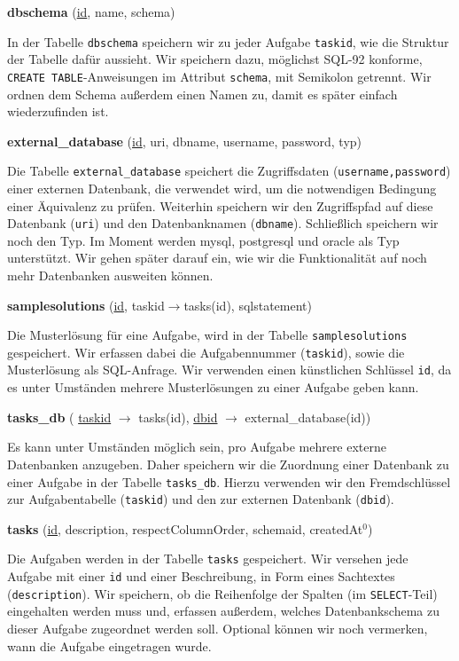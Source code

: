 \textbf{dbschema} (\underline{id}, name, schema)

In der Tabelle \verb|dbschema| speichern wir zu jeder Aufgabe \verb|taskid|, wie die Struktur der Tabelle dafür aussieht. Wir speichern dazu, möglichst SQL-92 konforme, \verb|CREATE TABLE|-Anweisungen im Attribut \verb|schema|, mit Semikolon getrennt. Wir ordnen dem Schema außerdem einen Namen zu, damit es später einfach wiederzufinden ist.

\textbf{external\_database} (\underline{id}, uri, dbname, username, password, typ)

Die Tabelle \verb|external_database| speichert die Zugriffsdaten (\verb|username,password|) einer externen Datenbank, die verwendet wird, um die notwendigen Bedingung einer Äquivalenz zu prüfen. Weiterhin speichern wir den Zugriffspfad auf diese Datenbank (\verb|uri|) und den Datenbanknamen (\verb|dbname|). Schließlich speichern wir noch den Typ. Im Moment werden mysql, postgresql und oracle als Typ unterstützt. Wir gehen später darauf ein, wie wir die Funktionalität auf noch mehr Datenbanken ausweiten können.

\textbf{samplesolutions} (\underline{id}, taskid$\to$tasks(id), sqlstatement)

Die Musterlösung für eine Aufgabe, wird in der Tabelle \verb|samplesolutions| gespeichert. Wir erfassen dabei die Aufgabennummer (\verb|taskid|), sowie die Musterlösung als SQL-Anfrage. Wir verwenden einen künstlichen Schlüssel \verb|id|, da es unter Umständen mehrere Musterlösungen zu einer Aufgabe geben kann.

\textbf{tasks\_db} ( \underline{taskid} $\to$ tasks(id), \underline{dbid} $\to$ external\_database(id))

Es kann unter Umständen möglich sein, pro Aufgabe mehrere externe Datenbanken anzugeben. Daher speichern wir die Zuordnung einer Datenbank zu einer Aufgabe in der Tabelle \verb|tasks_db|. Hierzu verwenden wir den Fremdschlüssel zur Aufgabentabelle (\verb|taskid|) und den zur externen Datenbank (\verb|dbid|).

\textbf{tasks} (\underline{id}, description, respectColumnOrder, schemaid, createdAt$^0$)

Die Aufgaben werden in der Tabelle \verb|tasks| gespeichert. Wir versehen jede Aufgabe mit einer \verb|id| und einer Beschreibung, in Form eines Sachtextes (\verb|description|). Wir speichern, ob die Reihenfolge der Spalten (im \verb|SELECT|-Teil) eingehalten werden muss und, erfassen außerdem, welches Datenbankschema zu dieser Aufgabe zugeordnet werden soll. Optional können wir noch vermerken, wann die Aufgabe eingetragen wurde.

